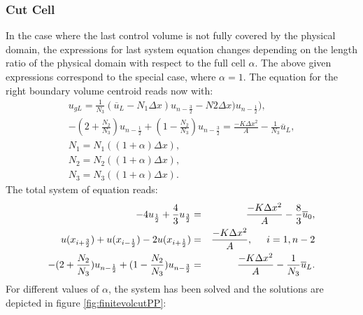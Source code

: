 \documentclass[a4paper,12pt]{article}
\begin{document}
\subsubsection{Cut Cell}
In the case where the last control volume is not fully covered by the physical domain, the expressions for last system equation changes depending on the length ratio of the physical domain with respect to the full cell $\alpha$. The above given expressions correspond to the special case, where $\alpha = 1$.
The equation for the right boundary volume centroid reads now with:
\begin{eqnarray}
u_{gL} = \frac{1}{N_3}(\overline{u}_L -N_1\Delta x)u_{n-\frac{3}{2}} -N2\Delta x) u_{n-\frac{1}{2}}),\\
-(2+\frac{N_2}{N_3}) u_{n-\frac{1}{2}} + (1-\frac{N_2}{N_3})u_{n-\frac{3}{2}} = \frac{-K\Delta x^2}{A} - \frac{1}{N_3}\overline{u}_L,\\
N_1 = N_1((1+\alpha)\Delta x),\\
N_2 = N_2((1+\alpha)\Delta x),\\
N_3 = N_3((1+\alpha)\Delta x).
\end{eqnarray}
The total system of equation reads:
\begin{eqnarray}
-4 u_{\frac{1}{2}} + \frac{4}{3}u_{\frac{3}{2}} &=& \frac{-K\Delta x^2}{A} - \frac{8}{3}\overline{u}_0,\\
u(x_{i+\frac{3}{2}})+u(x_{i-\frac{1}{2}})-2u(x_{i+\frac{1}{2}}) &=& \frac{-K\Delta x^2}{A},\hspace*{0.5cm} i=1,n-2\\
-(2+\frac{N_2}{N_3}) u_{n-\frac{1}{2}} + (1-\frac{N_2}{N_3})u_{n-\frac{3}{2}} &=& \frac{-K\Delta x^2}{A} - \frac{1}{N_3}\overline{u}_L.
\end{eqnarray}
For different values of $\alpha$, the system has been solved and the solutions are depicted in figure \ref{fig:finitevolcutPP}:
\end{document}
